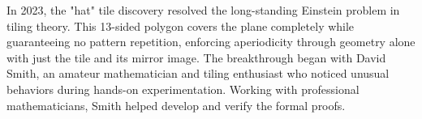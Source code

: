 In 2023, the "hat" tile discovery resolved the long-standing Einstein problem in tiling theory. This 13-sided polygon covers the plane completely while guaranteeing no pattern repetition, enforcing aperiodicity through geometry alone with just the tile and its mirror image. The breakthrough began with David Smith, an amateur mathematician and tiling enthusiast who noticed unusual behaviors during hands-on experimentation. Working with professional mathematicians, Smith helped develop and verify the formal proofs.
